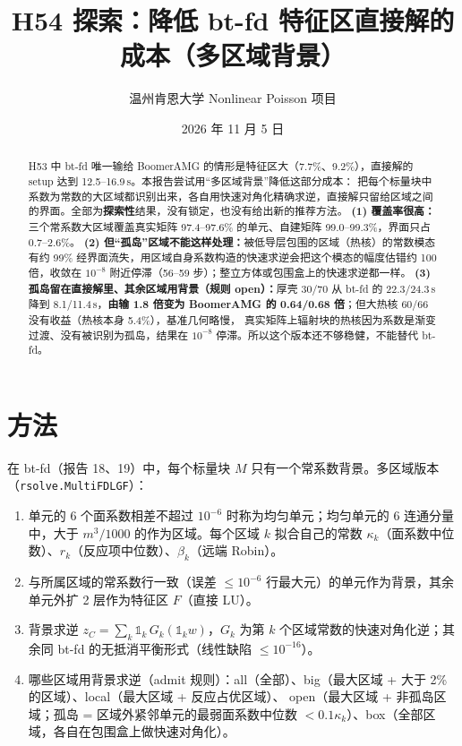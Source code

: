 \documentclass[11pt,a4paper]{ctexart}
\title{H54 探索：降低 bt-fd 特征区直接解的成本（多区域背景）}
\author{温州肯恩大学 \quad Nonlinear Poisson 项目}
\date{2026 年 11 月 5 日}
\begin{document}
\maketitle

\begin{abstract}
H53 中 bt-fd 唯一输给 BoomerAMG 的情形是特征区大（7.7\%、9.2\%），直接解的 setup 达到 12.5--16.9\,s。本报告尝试用“多区域背景”降低这部分成本：
把每个标量块中系数为常数的大区域都识别出来，各自用快速对角化精确求逆，直接解只留给区域之间的界面。全部为\textbf{探索性}结果，没有锁定，也没有给出新的推荐方法。
\textbf{(1) 覆盖率很高：}三个常系数大区域覆盖真实矩阵 97.4--97.6\% 的单元、自建矩阵 99.0--99.3\%，界面只占 0.7--2.6\%。
\textbf{(2) 但“孤岛”区域不能这样处理：}被低导层包围的区域（热核）的常数模态有约 99\% 经界面流失，用区域自身系数构造的快速求逆会把这个模态的幅度估错约 100 倍，收敛在 $10^{-8}$ 附近停滞（56--59 步）；整立方体或包围盒上的快速求逆都一样。
\textbf{(3) 孤岛留在直接解里、其余区域用背景（规则 open）：}厚壳 30/70 从 bt-fd 的 22.3/24.3\,s 降到 8.1/11.4\,s，\textbf{由输 1.8 倍变为 BoomerAMG 的 0.64/0.68 倍}；但大热核 60/66 没有收益（热核本身 5.4\%），基准几何略慢，
真实矩阵上辐射块的热核因为系数是渐变过渡、没有被识别为孤岛，结果在 $10^{-8}$ 停滞。所以这个版本还不够稳健，不能替代 bt-fd。
\end{abstract}

\section{方法}
在 bt-fd（报告 18、19）中，每个标量块 $M$ 只有一个常系数背景。多区域版本（\texttt{rsolve.MultiFDLGF}）：
\begin{enumerate}
\item 单元的 6 个面系数相差不超过 $10^{-6}$ 时称为均匀单元；均匀单元的 6 连通分量中，大于 $m^3/1000$ 的作为区域。每个区域 $k$ 拟合自己的常数 $\kappa_k$（面系数中位数）、$r_k$（反应项中位数）、$\beta_k$（远端 Robin）。
\item 与所属区域的常系数行一致（误差 $\le10^{-6}$ 行最大元）的单元作为背景，其余单元外扩 2 层作为特征区 $F$（直接 LU）。
\item 背景求逆 $z_C=\sum_k \mathbb 1_k\,G_k(\mathbb 1_k w)$，$G_k$ 为第 $k$ 个区域常数的快速对角化逆；其余同 bt-fd 的无抵消平衡形式（线性缺陷 $\le10^{-16}$）。
\item 哪些区域用背景求逆（admit 规则）：all（全部）、big（最大区域 + 大于 2\% 的区域）、local（最大区域 + 反应占优区域）、
open（最大区域 + 非孤岛区域；孤岛 = 区域外紧邻单元的最弱面系数中位数 $<0.1\kappa_k$）、box（全部区域，各自在包围盒上做快速对角化）。
\end{enumerate}
\end{document}

